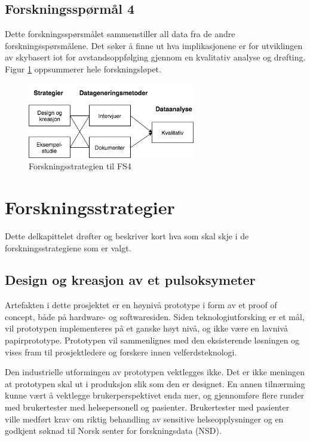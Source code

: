 \subsection{Forskningsspørmål 4}
\textbf{}

Dette forskningsspørsmålet sammenstiller all data fra de andre forskningsspørsmålene. Det søker å finne ut hva implikasjonene
er for utviklingen av skybasert \gls{iot} for avstandsoppfølging gjennom en kvalitativ analyse og drøfting.
Figur \ref{fig:oates_fs4} oppsummerer hele forskningsløpet.

\begin{figure}
\centering
\includegraphics[width=0.65\textwidth]{fig/oates/fs4}
\caption{Forskningsstrategien til FS4}
\label{fig:oates_fs4}
\end{figure}

\section{Forskningsstrategier}
\label{sec:forskningsstrategier}
Dette delkapittelet drøfter og beskriver kort hva som skal skje i de forskningsstrategiene som er valgt.

\subsection{Design og kreasjon av et pulsoksymeter}
Artefakten i dette prosjektet er en høynivå prototype i form av et proof of concept, både på hardware- og softwaresiden.
Siden teknologiutforsking er et mål, vil
prototypen implementeres på et ganske høyt nivå, og ikke være en lavnivå papirprototype. Prototypen vil sammenlignes
med den eksisterende løsningen og vises fram til prosjektledere og forskere innen velferdsteknologi.

Den industrielle utformingen av prototypen vektlegges ikke. Det er
ikke meningen at prototypen skal ut i produksjon slik som den er designet. En annen tilnærming kunne vært å vektlegge brukerperspektivet enda mer,
og gjennomføre flere runder med brukertester med helsepersonell og pasienter. Brukertester med pasienter ville medført krav om
riktig behandling av sensitive helseopplysninger og en godkjent søknad til Norsk senter for forskningsdata (NSD).

